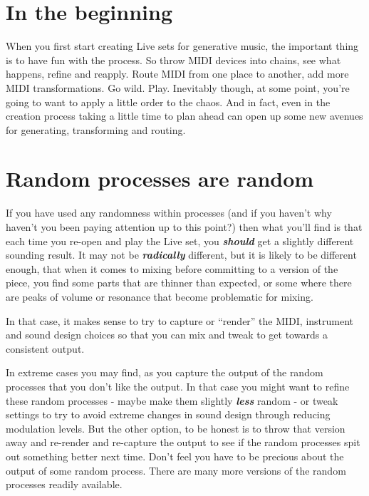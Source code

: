 \documentclass[
  12pt,
  letterpaper,
  oneside,
  open=any]{scrbook}
\begin{document}
\section{In the beginning}\label{in-the-beginning}

When you first start creating Live sets for generative music, the
important thing is to have fun with the process. So throw MIDI devices
into chains, see what happens, refine and reapply. Route MIDI from one
place to another, add more MIDI transformations. Go wild. Play.
Inevitably though, at some point, you're going to want to apply a little
order to the chaos. And in fact, even in the creation process taking a
little time to plan ahead can open up some new avenues for generating,
transforming and routing.

\section{Random processes are random}\label{random-processes-are-random}

If you have used any randomness within processes (and if you haven't why
haven't you been paying attention up to this point?) then what you'll
find is that each time you re-open and play the Live set, you
\textbf{\emph{should}} get a slightly different sounding result. It may
not be \textbf{\emph{radically}} different, but it is likely to be
different enough, that when it comes to mixing before committing to a
version of the piece, you find some parts that are thinner than
expected, or some where there are peaks of volume or resonance that
become problematic for mixing.

In that case, it makes sense to try to capture or ``render'' the MIDI,
instrument and sound design choices so that you can mix and tweak to get
towards a consistent output.

In extreme cases you may find, as you capture the output of the random
processes that you don't like the output. In that case you might want to
refine these random processes - maybe make them slightly
\textbf{\emph{less}} random - or tweak settings to try to avoid extreme
changes in sound design through reducing modulation levels. But the
other option, to be honest is to throw that version away and re-render
and re-capture the output to see if the random processes spit out
something better next time. Don't feel you have to be precious about the
output of some random process. There are many more versions of the
random processes readily available.
\end{document}
